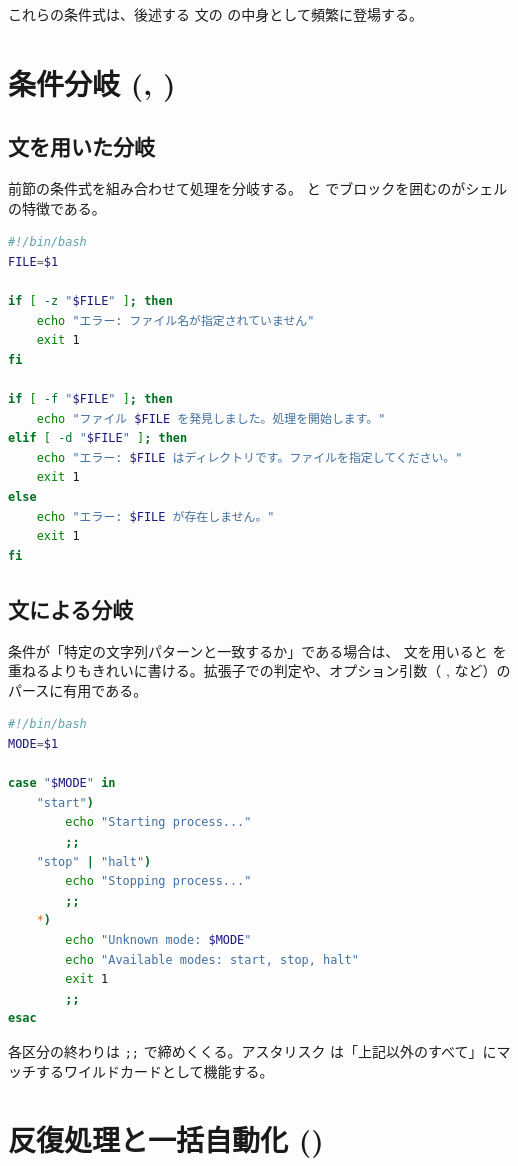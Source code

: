 これらの条件式は、後述する  文の \code{[]} の中身として頻繁に登場する。

\section{条件分岐 (, )}

\subsection{ 文を用いた分岐}

前節の条件式を組み合わせて処理を分岐する。 と  でブロックを囲むのがシェルの特徴である。

\begin{lstlisting}[language=bash]
#!/bin/bash
FILE=$1

if [ -z "$FILE" ]; then
    echo "エラー: ファイル名が指定されていません"
    exit 1
fi

if [ -f "$FILE" ]; then
    echo "ファイル $FILE を発見しました。処理を開始します。"
elif [ -d "$FILE" ]; then
    echo "エラー: $FILE はディレクトリです。ファイルを指定してください。"
    exit 1
else
    echo "エラー: $FILE が存在しません。"
    exit 1
fi
\end{lstlisting}

\subsection{ 文による分岐}

条件が「特定の文字列パターンと一致するか」である場合は、 文を用いると  を重ねるよりもきれいに書ける。拡張子での判定や、オプション引数（ ,  など）のパースに有用である。

\begin{lstlisting}[language=bash]
#!/bin/bash
MODE=$1

case "$MODE" in
    "start")
        echo "Starting process..."
        ;;
    "stop" | "halt")
        echo "Stopping process..."
        ;;
    *)
        echo "Unknown mode: $MODE"
        echo "Available modes: start, stop, halt"
        exit 1
        ;;
esac
\end{lstlisting}

各区分の終わりは \verb|;;| で締めくくる。アスタリスク \code{*} は「上記以外のすべて」にマッチするワイルドカードとして機能する。

\section{反復処理と一括自動化 ()}

